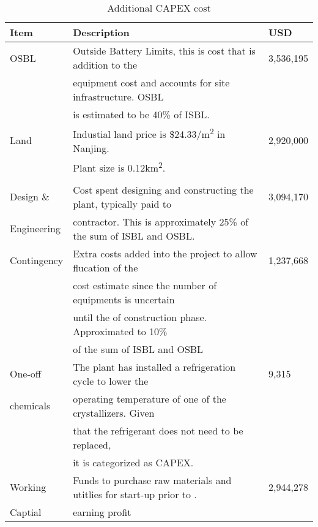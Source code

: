 \begin{table}[H]
\centering
\caption{Additional CAPEX cost}
\label{tab:CAPEXadditional}
\begin{tabular}{lll}
\toprule
\textbf{Item}        & \textbf{Description }                                                                      & \textbf{USD}       \\\midrule
OSBL        & Outside Battery Limits, this is cost that is addition to the                      & 3,536,195 \\
            & equipment cost and accounts for site infrastructure. OSBL                         &           \\
            & is estimated to be 40\% of ISBL.                                                  &           \\\hline
Land        & Industial land price is \$24.33/m\textsuperscript{2} in Nanjing. & 2,920,000 \\
            & Plant size is 0.12km\textsuperscript{2}.                         &           \\\hline
\\[-0.5em]
Design \&   & Cost spent designing and constructing the plant, typically paid to                & 3,094,170 \\
Engineering & contractor. This is approximately 25\% of the sum of ISBL and OSBL.               &           \\\hline
Contingency & Extra costs added into the project to allow flucation of the                      & 1,237,668 \\
            & cost estimate since the number of equipments is uncertain                         &           \\
            & until the of construction phase. Approximated to 10\%                             &           \\
            & of the sum of ISBL and OSBL                                                       &           \\\hline
One-off     & The plant has installed a refrigeration cycle to lower the                        & 9,315     \\
chemicals   & operating temperature of one of the crystallizers. Given                          &           \\
            & that the refrigerant does not need to be replaced,                                &           \\
            & it is categorized as CAPEX.                                                       &           \\\hline
Working     & Funds to purchase raw materials and utitlies for start-up prior to .              & 2,944,278 \\
Captial     & earning profit                                                                    &       \\\bottomrule   
\end{tabular}
\end{table}